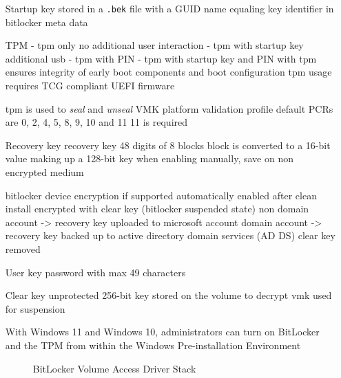 \begin{itemize}
    \item[Startup key] stored in a \lstinline{.bek} file with a \ac{GUID} name equaling key identifier in bitlocker meta data
        \cite[2.6. Startup key]{bde-format-spec}
    \item[TPM]
        - tpm only
        no additional user interaction
        - tpm with startup key
        additional usb
        - tpm with PIN
        - tpm with startup key and PIN
        \cite{microsoft-bitlocker-countermeasures}
        with tpm ensures integrity of early boot components and boot configuration
        tpm usage requires \ac{TCG} compliant \ac{UEFI} firmware \cite[9. TPM]{windows-internals-6-part2}

        tpm is used to \emph{seal} and \emph{unseal} \ac{VMK}
        platform validation profile
        default \acp{PCR} are 0, 2, 4, 5, 8, 9, 10 and 11
        11 is required
    \item[Recovery key] recovery key 48 digits of 8 blocks
        block is converted to a 16-bit value making up a 128-bit key
        \cite[2.4. Recovery key]{bde-format-spec}
        when enabling manually, save on non encrypted medium
        \cite{microsoft-bitlocker-basic-deployment}

        bitlocker device encryption if supported automatically enabled
        after clean install encrypted with clear key (bitlocker suspended state)
        non domain account -> recovery key uploaded to microsoft account
        domain account -> recovery key backed up to active directory domain services (AD DS)
        clear key removed
        \cite{microsoft-bitlocker-device-encryption}

    \item[User key] password with max 49 characters
        \cite[2.7. User key]{bde-format-spec}
    \item[Clear key] unprotected 256-bit key stored on the volume to decrypt vmk
        \cite[2.5. Clear key]{bde-format-spec}
        used for suspension


         With Windows 11 and Windows 10, administrators can turn on BitLocker and the TPM from within the Windows Pre-installation Environment \cite{microsoft-bitlocker-device-encryption}

        \begin{figure}[htb]%
            \centering
            
            \caption{BitLocker Volume Access Driver Stack}%
            \label{fig:bitlocker_volume_access_stack}%
        \end{figure}

\end{itemize}